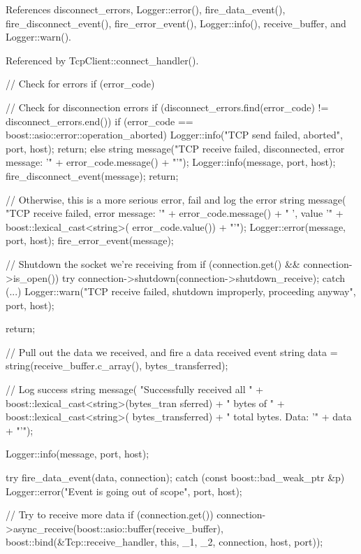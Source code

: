 References disconnect\_\-errors, Logger::error(), fire\_\-data\_\-event(), fire\_\-disconnect\_\-event(), fire\_\-error\_\-event(), Logger::info(), receive\_\-buffer, and Logger::warn().



Referenced by TcpClient::connect\_\-handler().


\begin{DoxyCode}
{
    // Check for errors
    if (error_code)
    {
        // Check for disconnection errors
        if (disconnect_errors.find(error_code) != disconnect_errors.end())
        {
            if (error_code == boost::asio::error::operation_aborted)
            {
                Logger::info("TCP send failed, aborted", port, host);
                return;
            }
            else
            {
                string message("TCP receive failed, disconnected, error message: 
      '" + error_code.message() + "'");
                Logger::info(message, port, host);
                fire_disconnect_event(message);
                return;
            }
        }

        // Otherwise, this is a more serious error, fail and log the error
        string message(
                "TCP receive failed, error message: '" + error_code.message() + "
      ', value '" + boost::lexical_cast<string>(
                        error_code.value()) + "'");
        Logger::error(message, port, host);
        fire_error_event(message);

        // Shutdown the socket we're receiving from
        if (connection.get() && connection->is_open())
        {
            try
            {
                connection->shutdown(connection->shutdown_receive);
            }
            catch (...)
            {
                Logger::warn("TCP receive failed, shutdown improperly, proceeding
       anyway", port, host);
            }
        }

        return;
    }

    // Pull out the data we received, and fire a data received event
    string data = string(receive_buffer.c_array(), bytes_transferred);

    // Log success
    string message(
            "Successfully received all " + boost::lexical_cast<string>(bytes_tran
      sferred) + " bytes of " + boost::lexical_cast<string>(
                    bytes_transferred) + " total bytes. Data: '" + data + "'");

    Logger::info(message, port, host);

    try
    {
        fire_data_event(data, connection);
    }
    catch (const boost::bad_weak_ptr &p)
    {
        Logger::error("Event is going out of scope", port, host);
    }

    // Try to receive more data
    if (connection.get())
        connection->async_receive(boost::asio::buffer(receive_buffer),
                boost::bind(&Tcp::receive_handler, this, _1, _2, connection, 
      host, port));
}
\end{DoxyCode}
